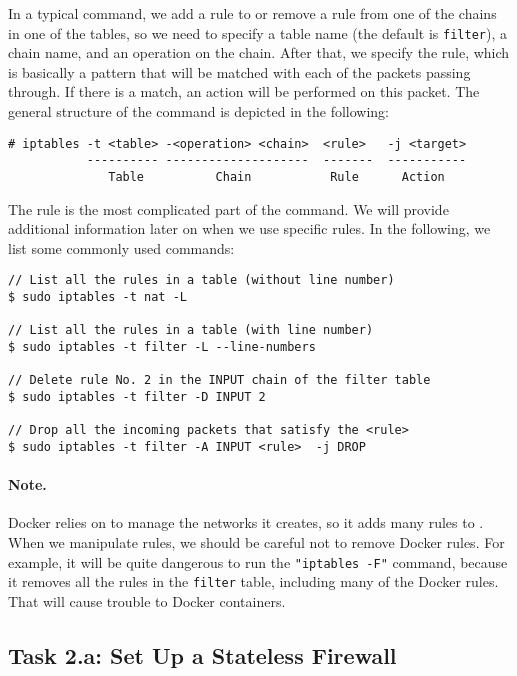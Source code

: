 In a typical \iptables command, we add a rule to or remove a rule 
from one of the chains in one of the tables, so we need to 
specify a table name (the default is \texttt{filter}), a chain name, 
and an operation on the chain. After that, we specify the rule, which
is basically a pattern that will be matched with each of the 
packets passing through. If there is a match, an action will be 
performed on this packet. 
The general structure of the command is depicted in the following:

\begin{lstlisting}
# iptables -t <table> -<operation> <chain>  <rule>   -j <target>
           ---------- --------------------  -------  -----------
              Table          Chain           Rule      Action
\end{lstlisting}


The rule is the most complicated part of the \iptables command. 
We will provide additional information later on when we use 
specific rules. In the following, we list some commonly 
used commands: 


\begin{lstlisting}
// List all the rules in a table (without line number)
$ sudo iptables -t nat -L

// List all the rules in a table (with line number)
$ sudo iptables -t filter -L --line-numbers

// Delete rule No. 2 in the INPUT chain of the filter table 
$ sudo iptables -t filter -D INPUT 2

// Drop all the incoming packets that satisfy the <rule>
$ sudo iptables -t filter -A INPUT <rule>  -j DROP
\end{lstlisting}


\paragraph{Note.} Docker relies on \iptables to manage 
the networks it creates, so it adds many rules to \iptables.
When we manipulate \iptables rules, we should be careful 
not to remove Docker rules. For example, it will be quite
dangerous to run the \texttt{"iptables -F"} command, because 
it removes all the rules in the \texttt{filter} table,
including many of the Docker rules. That will cause 
trouble to Docker containers. 


\subsection{Task 2.a: Set Up a Stateless Firewall}

